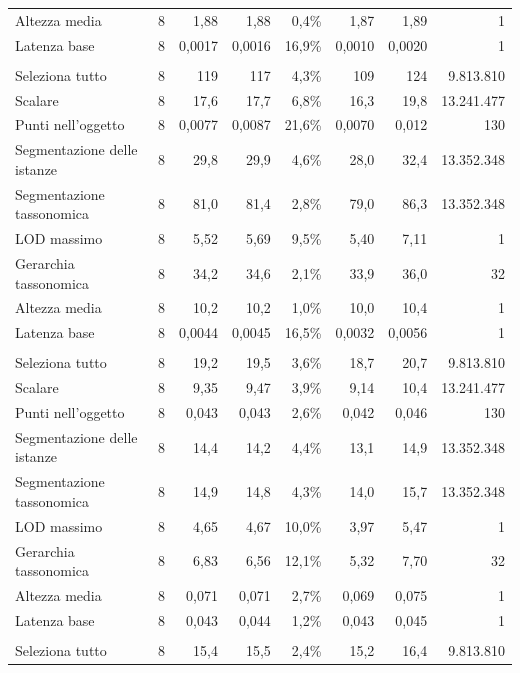 \begin{small}
\begin{longtable}{lrrrrrr r}
\quad Altezza media & 8 & 1,88 & 1,88 & 0,4\% & 1,87 & 1,89 & 1 \\
\quad Latenza base & 8 & 0,0017 & 0,0016 & 16,9\% & 0,0010 & 0,0020 & 1 \\
\addlinespace
\multicolumn{8}{l}{\textbf{qEndpoint}}\\
\quad Seleziona tutto & 8 & 119 & 117 & 4,3\% & 109 & 124 & 9.813.810 \\
\quad Scalare & 8 & 17,6 & 17,7 & 6,8\% & 16,3 & 19,8 & 13.241.477 \\
\quad Punti nell'oggetto & 8 & 0,0077 & 0,0087 & 21,6\% & 0,0070 & 0,012 & 130 \\
\quad Segmentazione delle istanze & 8 & 29,8 & 29,9 & 4,6\% & 28,0 & 32,4 & 13.352.348 \\
\quad Segmentazione tassonomica & 8 & 81,0 & 81,4 & 2,8\% & 79,0 & 86,3 & 13.352.348 \\
\quad LOD massimo & 8 & 5,52 & 5,69 & 9,5\% & 5,40 & 7,11 & 1 \\
\quad Gerarchia tassonomica & 8 & 34,2 & 34,6 & 2,1\% & 33,9 & 36,0 & 32 \\
\quad Altezza media & 8 & 10,2 & 10,2 & 1,0\% & 10,0 & 10,4 & 1 \\
\quad Latenza base & 8 & 0,0044 & 0,0045 & 16,5\% & 0,0032 & 0,0056 & 1 \\
\addlinespace
\multicolumn{8}{l}{\textbf{QLever}}\\
\quad Seleziona tutto & 8 & 19,2 & 19,5 & 3,6\% & 18,7 & 20,7 & 9.813.810 \\
\quad Scalare & 8 & 9,35 & 9,47 & 3,9\% & 9,14 & 10,4 & 13.241.477 \\
\quad Punti nell'oggetto & 8 & 0,043 & 0,043 & 2,6\% & 0,042 & 0,046 & 130 \\
\quad Segmentazione delle istanze & 8 & 14,4 & 14,2 & 4,4\% & 13,1 & 14,9 & 13.352.348 \\
\quad Segmentazione tassonomica & 8 & 14,9 & 14,8 & 4,3\% & 14,0 & 15,7 & 13.352.348 \\
\quad LOD massimo & 8 & 4,65 & 4,67 & 10,0\% & 3,97 & 5,47 & 1 \\
\quad Gerarchia tassonomica & 8 & 6,83 & 6,56 & 12,1\% & 5,32 & 7,70 & 32 \\
\quad Altezza media & 8 & 0,071 & 0,071 & 2,7\% & 0,069 & 0,075 & 1 \\
\quad Latenza base & 8 & 0,043 & 0,044 & 1,2\% & 0,043 & 0,045 & 1 \\
\addlinespace
\multicolumn{8}{l}{\textbf{RDFox}}\\
\quad Seleziona tutto & 8 & 15,4 & 15,5 & 2,4\% & 15,2 & 16,4 & 9.813.810 \\

\end{longtable}
\end{small}
